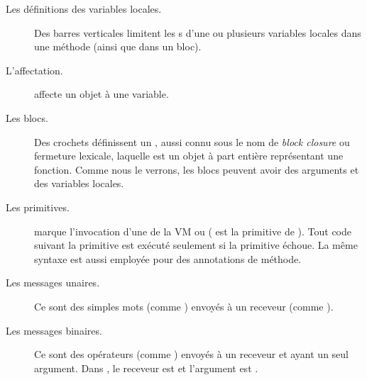 \documentclass[a4paper,10pt,twoside]{book}
\begin{document}
\begin{description}
\item[Les d\'{e}finitions des variables locales.] Des barres
  verticales \ct{| |} limitent les
  s d'une ou plusieurs variables
  locales dans une m\'{e}thode (ainsi que dans un bloc).

\item[L'affectation.]	\ct{:=} affecte un objet \`{a} une variable.

\item[Les blocs.] Des crochets \ct{[ ]} définissent un ,
  aussi connu sous le nom de \emph{block closure} ou fermeture lexicale, laquelle est un objet \`{a} part enti\`{e}re repr\'{e}sentant une fonction.
Comme nous le verrons, les blocs peuvent avoir des arguments et des variables locales.

\item[Les primitives.]	 marque l'invocation
  d'une  de la VM ou 
( est la primitive de ).
Tout code suivant la primitive est ex\'{e}cut\'{e} seulement si la
primitive \'{e}choue.
La m\^{e}me syntaxe est aussi employ\'{e}e pour des annotations de
m\'{e}thode. %

\item[Les messages unaires.] Ce sont des simples mots (comme ) envoy\'{e}s \`{a} un receveur (comme ).

\item[Les messages binaires.] Ce sont des op\'{e}rateurs (comme \ct{+}) envoy\'{e}s \`{a} un receveur et ayant un seul argument. Dans , le receveur est  et l'argument est .


\end{description}
\end{document}

